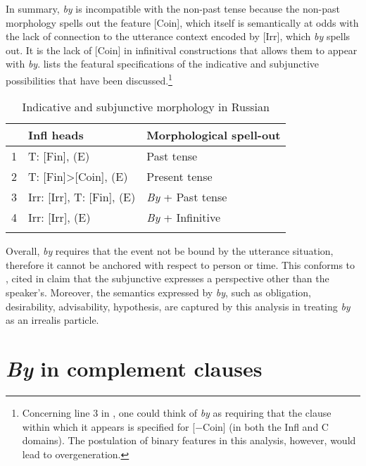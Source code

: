 \documentclass[output=paper,
modfonts,
newtxmath,
hidelinks,
]{langscibook}
\begin{document}
In summary, \textit{by} is incompatible with the non-past tense because the non-past morphology spells out the feature [Coin], which itself is semantically at odds with the lack of connection to the utterance context encoded by [Irr], which \textit{by} spells out. It is the lack of [Coin] in infinitival constructions that allows them to appear with \textit{by}.  lists the featural specifications of the indicative and subjunctive possibilities that have been discussed.\footnote{\label{10:fn4}Concerning line 3 in , one could think of \textit{by} as requiring that the clause within which it appears is specified for [$-$Coin] (in both the Infl and C domains). The postulation of binary features in this analysis, however, would lead to overgeneration.}

\begin{table}[h]
\caption{Indicative and subjunctive morphology in Russian}
\label{10:table2}
\begin{tabularx}{.80\textwidth}{rlX}
\lsptoprule
&\textbf{Infl heads} & \textbf{Morphological spell-out}\\
\midrule
1&T: [Fin], (E) & Past tense\\
2&T: [Fin]>[Coin], (E) & Present tense\\
3&Irr: [Irr], T: [Fin], (E) & \textit{By} + Past tense\\
4&Irr: [Irr], (E) & \textit{By} + Infinitive\\
\lspbottomrule
\end{tabularx}
\label{10:table:table_2}
\end{table}

Overall, \textit{by} requires that the event not be bound by the utterance situation, therefore it cannot be anchored with respect to person or time. This conforms to , cited in \citet[10]{Cowper2002} claim that the subjunctive expresses a perspective other than the speaker’s. Moreover, the semantics expressed by \textit{by}, such as obligation, desirability, advisability, hypothesis, are captured by this analysis in treating \textit{by} as an irrealis particle.



\section{\textit{By} in complement clauses}\label{10:s5}
\end{document}
